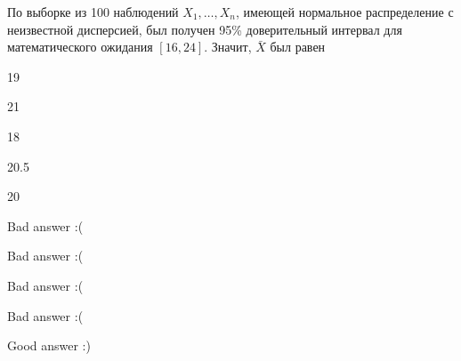 
\begin{question}
По выборке из 100 наблюдений \(X_1,\ldots,X_{n}\), имеющей нормальное
распределение с неизвестной дисперсией, был получен 95\% доверительный
интервал для математического ожидания \([16,24]\). Значит, \(\bar{X}\)
был равен
\begin{answerlist}
  \item 19
  \item 21
  \item 18
  \item 20.5
  \item 20
\end{answerlist}
\end{question}

\begin{solution}
\begin{answerlist}
  \item Bad answer :(
  \item Bad answer :(
  \item Bad answer :(
  \item Bad answer :(
  \item Good answer :)
\end{answerlist}
\end{solution}

